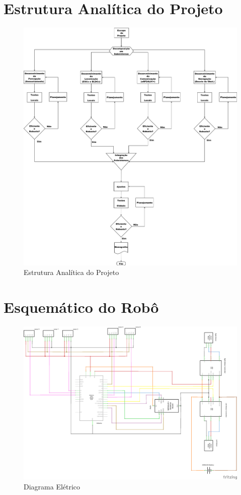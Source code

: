 \section{Estrutura Analítica do Projeto}
  \begin{figure}[!htb] %
    \centering
    \includegraphics[width=\linewidth]{../../Imagens/WBS.png}
    \caption{Estrutura Analítica do Projeto} %
    \label{WBS}
  \end{figure}
  
\section{Esquemático do Robô}
  \begin{figure}[!htb]
    \centering
    \includegraphics[width=\linewidth]{../../Imagens/robot_schem.png}
    \caption{Diagrama Elétrico} %
    \label{fritzing}
  \end{figure}
  
